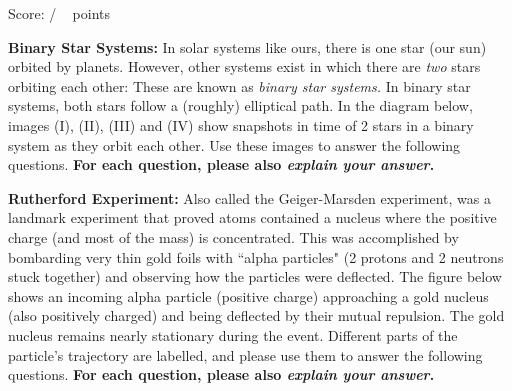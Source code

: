 \documentclass[addpoints,12pt]{exam}
\begin{document}
 
\clearpage

\begin{flushright}
Score: \hspace{0.2in} / \numpoints ~ points
\end{flushright}

\begin{questions}
\question \textbf{Binary Star Systems:} In solar systems like ours, there is one star (our sun) orbited by planets. However, other systems exist in which there are \textit{two} stars orbiting each other: These are known as \textit{binary star systems.} In binary star systems, both stars follow a (roughly) elliptical path. In the diagram below, images (I), (II), (III) and (IV) show snapshots in time of 2 stars in a binary system as they orbit each other. Use these images to answer the following questions. \textbf{For each question, please also \textit{explain your answer}.}

\begin{center}\end{center}


\clearpage

\question \textbf{Rutherford Experiment:} Also called the Geiger-Marsden experiment, was a landmark experiment that proved atoms contained a nucleus where the positive charge (and most of the mass) is concentrated. This was accomplished by bombarding very thin gold foils with ``alpha particles" (2 protons and 2 neutrons stuck together) and observing how the particles were deflected. The figure below shows an incoming alpha particle (positive charge) approaching a gold nucleus (also positively charged) and being deflected by their mutual repulsion. The gold nucleus remains nearly stationary during the event. Different parts of the particle's trajectory are labelled, and please use them to answer the following questions. \textbf{For each question, please also \textit{explain your answer}.}
	

\end{questions}
\end{document}
